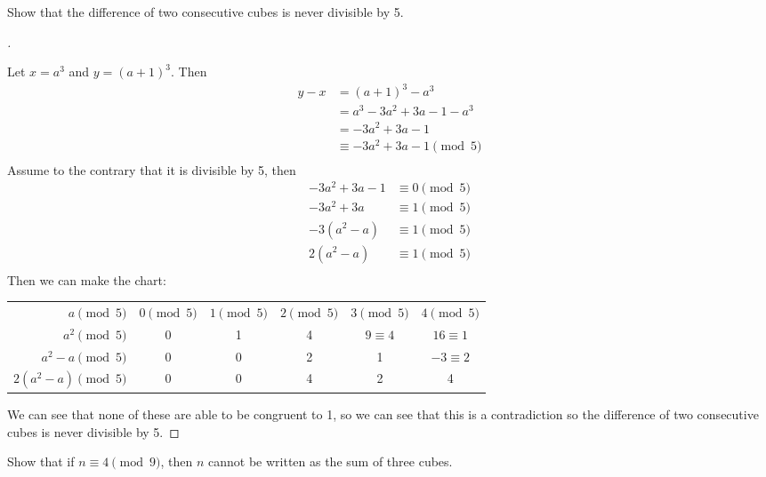 \documentclass[11pt]{article}
\newenvironment{myproof}[1][\proofname]{%
  \begin{proof}[#1]$ $\par\nobreak\ignorespaces
}{%
  \end{proof}
}
\newenvironment{problem}[2][Problem]{\begin{trivlist}
\item[\hskip \labelsep {\bfseries #1}\hskip \labelsep {\bfseries #2.}]}{\end{trivlist}}
\begin{document}
\begin{problem}{15}
Show that the difference of two consecutive cubes is never divisible by 5.
\end{problem}

\begin{myproof}
  Let $x=a^3$ and $y=(a+1)^3$. Then
  \begin{align*}
    y - x & = (a+1)^3 - a^3                \\
          & = a^3 - 3a^2 + 3a -1 -a^3      \\
          & = - 3a^2 + 3a -1               \\
          & \equiv - 3a^2 + 3a -1 \pmod{5} \\
  \end{align*}
  Assume to the contrary that it is divisible by 5, then
  \begin{align*}
    -3a^2 + 3a -1 & \equiv 0   \pmod{5} \\
    -3a^2 + 3a    & \equiv 1   \pmod{5} \\
    -3(a^2 -a)    & \equiv 1   \pmod{5} \\
    2(a^2 -a)     & \equiv 1   \pmod{5} \\
  \end{align*}
  Then we can make the chart:

  \setlength{\tabcolsep}{3pt}
  \begin{center}
    \begin{tabular}{r||c|c|c|c|c}
      $a     \pmod{5}$    & $0\pmod{5}$ & $1\pmod{5}$ & $2\pmod{5}$ & $3\pmod{5}$  & $4\pmod{5}$    \\
      $a^2  \pmod{5}$     & 0           & 1           & 4           & $9 \equiv 4$ & $16 \equiv 1 $ \\
      $a^2-a \pmod{5}$    & 0           & 0           & 2           & 1            & $-3 \equiv 2 $ \\
      $2(a^2-a) \pmod{5}$ & 0           & 0           & 4           & 2            & 4              \\
    \end{tabular}
  \end{center}
  We can see that none of these are able to be congruent to 1, so we can see that this is a contradiction so the difference of two consecutive cubes is never divisible by 5.

\end{myproof}


\begin{problem}{19}
Show that if $n\equiv 4\pmod{9}$, then $n$ cannot be written as the sum of three cubes.
\end{problem}
\end{document}
